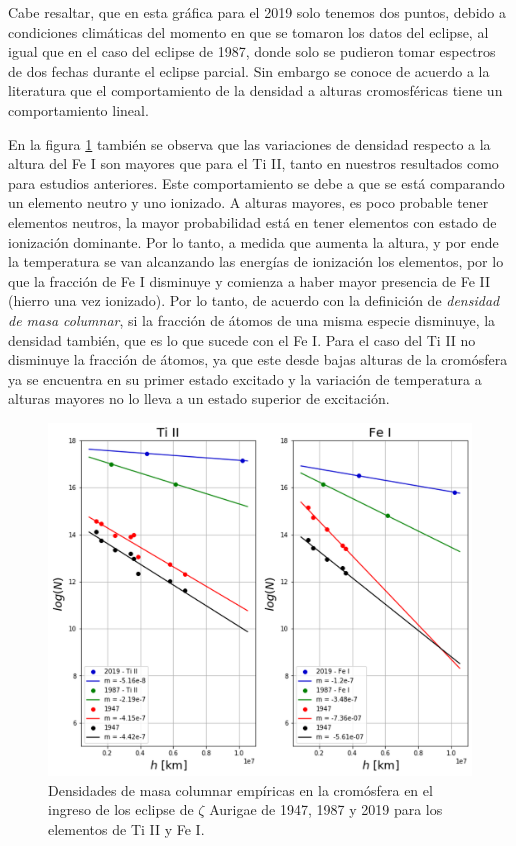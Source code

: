 \documentclass[12pt,oneside,openany,letter]{book}
\begin{document}
\vspace{20mm}

Cabe resaltar, que en esta gráfica para el 2019 solo tenemos dos puntos, debido a condiciones climáticas del momento en que se tomaron los datos del eclipse, al igual que en el caso del eclipse de 1987, donde solo se pudieron tomar espectros de dos fechas durante el eclipse parcial. Sin embargo se conoce de acuerdo a la literatura \citep{vernazza1973structure} que el comportamiento de la densidad a alturas cromosféricas tiene un comportamiento lineal.


En la figura \ref{fig:den_alt_compara} también se observa que las variaciones de densidad respecto a la altura del Fe I son mayores que para el Ti II, tanto en nuestros resultados como para estudios anteriores. Este comportamiento se debe a que se está comparando un elemento neutro y uno ionizado. A alturas mayores, es poco probable tener elementos neutros, la mayor probabilidad está en tener elementos con estado de ionización dominante. Por lo tanto, a medida que aumenta la altura, y por ende la temperatura se van alcanzando las energías de ionización los elementos, por lo que la fracción de Fe I disminuye y comienza a haber mayor presencia de Fe II (hierro una vez ionizado). Por lo tanto, de acuerdo con la definición de \textit{densidad de masa columnar}, si la fracción de átomos de una misma especie disminuye, la densidad también, que es lo que sucede con el Fe I. Para el caso del Ti II no disminuye la fracción de átomos, ya que este desde bajas alturas de la cromósfera ya se encuentra en su primer estado excitado y la variación de temperatura a alturas mayores no lo lleva a un estado superior de excitación.


\begin{figure}[h]
    \centering
    \includegraphics[width=1\linewidth]{Gaficas/alt_den.png}
    \caption{Densidades de masa columnar empíricas en la cromósfera en el ingreso de los eclipse de $\zeta$ Aurigae de 1947, 1987 y 2019 para los elementos de Ti II y Fe I.}
    \label{fig:den_alt_compara}
\end{figure}
\end{document}
